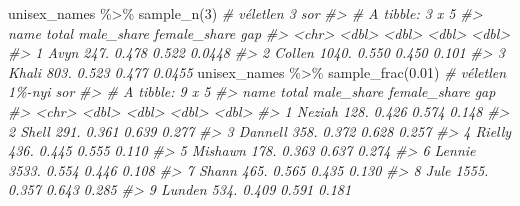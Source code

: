 \documentclass[
]{book}
\newenvironment{Shaded}{\begin{snugshade}}{\end{snugshade}}
\newcommand{\CommentTok}[1]{\textcolor[rgb]{0.56,0.35,0.01}{\textit{#1}}}
\newcommand{\DecValTok}[1]{\textcolor[rgb]{0.00,0.00,0.81}{#1}}
\newcommand{\FloatTok}[1]{\textcolor[rgb]{0.00,0.00,0.81}{#1}}
\newcommand{\FunctionTok}[1]{\textcolor[rgb]{0.00,0.00,0.00}{#1}}
\newcommand{\NormalTok}[1]{#1}
\newcommand{\SpecialCharTok}[1]{\textcolor[rgb]{0.00,0.00,0.00}{#1}}
\begin{document}
\begin{Shaded}
\begin{Highlighting}[]
\NormalTok{unisex\_names }\SpecialCharTok{\%\textgreater{}\%} \FunctionTok{sample\_n}\NormalTok{(}\DecValTok{3}\NormalTok{)        }\CommentTok{\# véletlen 3 sor}
\CommentTok{\#\textgreater{} \# A tibble: 3 x 5}
\CommentTok{\#\textgreater{}   name   total male\_share female\_share    gap}
\CommentTok{\#\textgreater{}   \textless{}chr\textgreater{}  \textless{}dbl\textgreater{}      \textless{}dbl\textgreater{}        \textless{}dbl\textgreater{}  \textless{}dbl\textgreater{}}
\CommentTok{\#\textgreater{} 1 Avyn    247.      0.478        0.522 0.0448}
\CommentTok{\#\textgreater{} 2 Collen 1040.      0.550        0.450 0.101 }
\CommentTok{\#\textgreater{} 3 Khali   803.      0.523        0.477 0.0455}
\NormalTok{unisex\_names }\SpecialCharTok{\%\textgreater{}\%} \FunctionTok{sample\_frac}\NormalTok{(}\FloatTok{0.01}\NormalTok{)  }\CommentTok{\# véletlen 1\%{-}nyi sor}
\CommentTok{\#\textgreater{} \# A tibble: 9 x 5}
\CommentTok{\#\textgreater{}   name    total male\_share female\_share   gap}
\CommentTok{\#\textgreater{}   \textless{}chr\textgreater{}   \textless{}dbl\textgreater{}      \textless{}dbl\textgreater{}        \textless{}dbl\textgreater{} \textless{}dbl\textgreater{}}
\CommentTok{\#\textgreater{} 1 Neziah   128.      0.426        0.574 0.148}
\CommentTok{\#\textgreater{} 2 Shell    291.      0.361        0.639 0.277}
\CommentTok{\#\textgreater{} 3 Dannell  358.      0.372        0.628 0.257}
\CommentTok{\#\textgreater{} 4 Rielly   436.      0.445        0.555 0.110}
\CommentTok{\#\textgreater{} 5 Mishawn  178.      0.363        0.637 0.274}
\CommentTok{\#\textgreater{} 6 Lennie  3533.      0.554        0.446 0.108}
\CommentTok{\#\textgreater{} 7 Shann    465.      0.565        0.435 0.130}
\CommentTok{\#\textgreater{} 8 Jule    1555.      0.357        0.643 0.285}
\CommentTok{\#\textgreater{} 9 Lunden   534.      0.409        0.591 0.181}
\end{Highlighting}
\end{Shaded}
\end{document}
